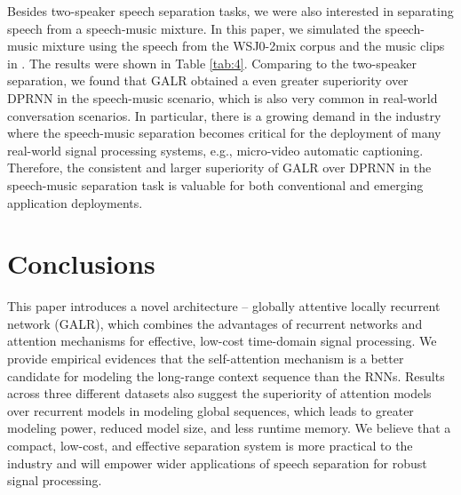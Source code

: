 \documentclass{article}
\begin{document}
Besides two-speaker speech separation tasks, we were also interested in separating speech from a speech-music mixture. In this paper, we simulated the speech-music mixture using the speech from the WSJ0-2mix corpus and the music clips in \cite{lam2020mixup}. The results were shown in Table \ref{tab:4}. Comparing to the two-speaker separation, we found that GALR obtained a even greater superiority over DPRNN in the speech-music scenario, which is also very common in real-world conversation scenarios. In particular, there is a growing demand in the industry where the speech-music separation becomes critical for the deployment of many real-world signal processing systems, e.g., micro-video automatic captioning. Therefore, the consistent and larger superiority of GALR over DPRNN in the speech-music separation task is valuable for both conventional and emerging application deployments.

\section{Conclusions}
\label{sec:4}
This paper introduces a novel architecture -- globally attentive locally recurrent network (GALR), which combines the advantages of recurrent networks and attention mechanisms for effective, low-cost time-domain signal processing. We provide empirical evidences that the self-attention mechanism is a better candidate for modeling the long-range context sequence than the RNNs. Results across three different datasets also suggest the superiority of attention models over recurrent models in modeling global sequences, which leads to greater modeling power, reduced model size, and less runtime memory.
We believe that a compact, low-cost, and effective separation system is more practical to the industry and will empower wider applications of speech separation for robust signal processing.



\end{document}
